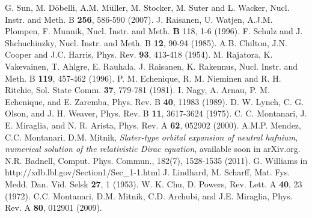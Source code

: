 \documentclass[aps,pra,reprint,groupedaddress]{revtex4-1}
\begin{document}
\begin{thebibliography}{00}
 G. Sun, M. D\"{o}belli, A.M. M\"{u}ller, M. Stocker, M. Suter and L. Wacker, Nucl. Instr. and Meth. B \textbf{256}, 586-590 (2007).
 J. Raisanen, U. Watjen, A.J.M. Plompen, F. Munnik, Nucl. Instr. and Meth. \textbf{B} 118, 1-6  (1996).
 F. Schulz and J. Shchuchinzky, Nucl. Instr. and Meth. B \textbf{12},  90-94 (1985).
 A.B. Chilton, J.N. Cooper and J.C. Harris, Phys. Rev. \textbf{93}, 413-418  (1954).
 M. Rajatora, K. Vakevainen, T. Ahlgre, E. Rauhala, J. Raisanen, K. Rakennus, Nucl. Instr. and Meth. B \textbf{119}, 457-462 (1996).
 P. M. Echenique, R. M. Nieminen and R. H. Ritchie, Sol. State Comm. \textbf{37}, 779-781 (1981).
 I. Nagy, A. Arnau, P. M. Echenique, and E. Zaremba, Phys. Rev. B \textbf{40}, 11983 (1989).
 D. W. Lynch, C. G. Olson, and J. H. Weaver, Phys. Rev. B \textbf{11}, 3617-3624 (1975).
 C. C. Montanari, J. E. Miraglia, and N. R. Arista, Phys. Rev. A \textbf{62}, 052902 (2000).
 A.M.P. Mendez, C.C. Montanari, D.M. Mitnik, \textit{Slater-type orbital expansion of neutral hafnium, numerical solution of the relativistic Dirac equation}, available soon in arXiv.org. 
 N.R. Badnell, Comput. Phys. Commun., 182(7), 1528-1535 (2011). %
 G. Williams in http://xdb.lbl.gov/Section1/Sec\_1-1.html
 J. Lindhard, M. Scharff,  Mat. Fys. Medd. Dan. Vid. Selsk  \textbf{27}, 1 (1953).
 W. K. Chu, D. Powers, Rev. Lett. A \textbf{40}, 23 (1972).
 C.C. Montanari, D.M. Mitnik, C.D. Archubi, and J.E. Miraglia, Phys. Rev. A \textbf{80}, 012901 (2009).
\end{thebibliography}
\end{document}
